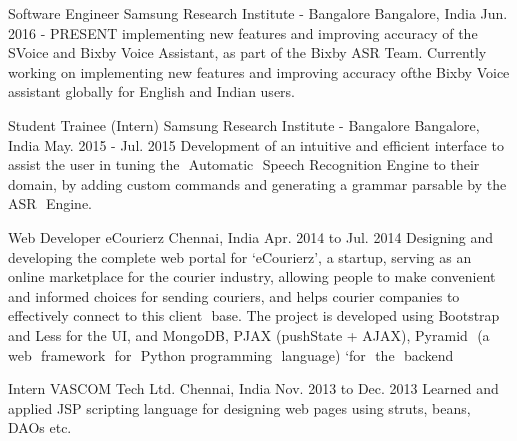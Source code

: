

\begin{cventries}

  \cventry
    {Software Engineer} %
    {Samsung Research Institute - Bangalore} %
    {Bangalore, India} %
    {Jun. 2016 - PRESENT} %
    {
      implementing new features and improving accuracy of the SVoice and Bixby Voice Assistant, as part of the Bixby ASR Team. Currently working on implementing new features and improving accuracy​ of​ ​the​ ​Bixby​ ​Voice​ ​assistant​ ​globally​ ​for​ ​English​ ​and​ ​Indian​ ​users.
    }

  \cventry
    {Student Trainee (Intern)} %
    {Samsung Research Institute - Bangalore} %
    {Bangalore, India} %
    {May. 2015 - Jul. 2015} %
    {
      Development of an intuitive and efficient interface to assist the user in tuning the ​ Automatic ​ Speech R​ecognition Engine to their domain, by adding custom commands and generating a grammar parsable by the ASR​ ​ Engine.
    }

  \cventry
    {Web Developer} %
    {eCourierz} %
    {Chennai, India} %
    {Apr. 2014 to Jul. 2014} %
    {
      Designing and developing the complete web portal for ‘eCourierz’, a startup, serving as an online marketplace for the courier industry, allowing people to make convenient and informed choices for sending couriers, and helps courier​ ​companies to​ ​effectively​ connect​ ​to​ ​this client​ ​ base. 
      The project is developed using Bootstrap and Less for the UI, and MongoDB, PJAX (pushState + AJAX), Pyramid​ ​ (a​ ​ web​ ​ framework​ ​ for​ ​ Python​ ​ programming​ ​ language)​ ​`for​ ​ the​ ​ backend
    }

  \cventry
    {Intern} %
    {VASCOM Tech Ltd.} %
    {Chennai, India} %
    {Nov. 2013 to Dec. 2013} %
    {
        Learned and applied JSP scripting language for designing web pages using struts, beans, DAOs etc.
    }


\end{cventries}
